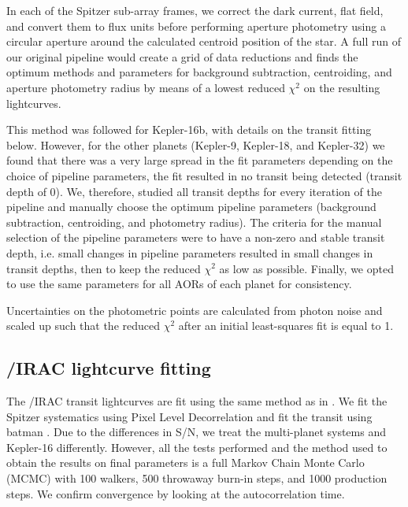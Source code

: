 In each of the Spitzer sub-array frames, we correct the dark current, flat field, and convert them to flux units before performing aperture photometry using a circular aperture around the calculated centroid position of the star. A full run of our original pipeline would create a grid of data reductions and finds the optimum methods and parameters for background subtraction, centroiding, and aperture photometry radius by means of a lowest reduced $\chi^2$ on the resulting lightcurves.

This method was followed for Kepler-16b, with details on the transit fitting below. However, for the other planets (Kepler-9, Kepler-18, and Kepler-32) we found that there was a very large spread in the fit parameters depending on the choice of pipeline parameters, the fit resulted in no transit being detected (transit depth of 0). We, therefore, studied all transit depths for every iteration of the pipeline and manually choose the optimum pipeline parameters (background subtraction, centroiding, and photometry radius). The criteria for the manual selection of the pipeline parameters were to have a non-zero and stable transit depth, i.e. small changes in pipeline parameters resulted in small changes in transit depths, then to keep the reduced $\chi^2$ as low as possible. Finally, we opted to use the same parameters for all AORs of each planet for consistency.


Uncertainties on the photometric points are calculated from photon noise and scaled up such that the reduced $\chi^2$ after an initial least-squares fit is equal to 1.

\subsection{\spitzer/IRAC lightcurve fitting}

The \spitzer/IRAC transit lightcurves are fit using the same method as in \citep{Baxter2021}. We fit the Spitzer systematics using Pixel Level Decorrelation \citep{Deming2015} and fit the transit using batman \citep{Kreidberg2015}. Due to the differences in S/N, we treat the multi-planet systems and Kepler-16 differently. However, all the tests performed and the method used to obtain the results on final parameters is a full Markov Chain Monte Carlo (MCMC) with 100 walkers, 500 throwaway burn-in steps, and 1000 production steps. We confirm convergence by looking at the autocorrelation time.

